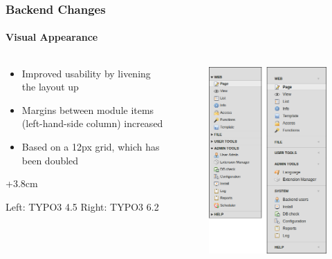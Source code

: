 
\begin{frame}[fragile]
	\frametitle{Backend Changes}
	\framesubtitle{Visual Appearance}

	\begin{columns}[T]

		\begin{column}{.5\textwidth}
			\begin{itemize}
				\item Improved usability by livening the layout up
				\item Margins between module items (left-hand-side column) increased
				\item Based on a 12px grid, which has been doubled
			\end{itemize}

			\advance\leftskip+3.8cm

			\smaller
				Left: TYPO3 4.5\newline
				Right: TYPO3 6.2
			\normalsize
		\end{column}

		\begin{column}{.5\textwidth}
			\begin{figure}\vspace*{-0.4cm}
				\includegraphics[width=0.6\linewidth]{Images/BackendChanges/VisualAppearance.png}
			\end{figure}
		\end{column}

	\end{columns}

\end{frame}

